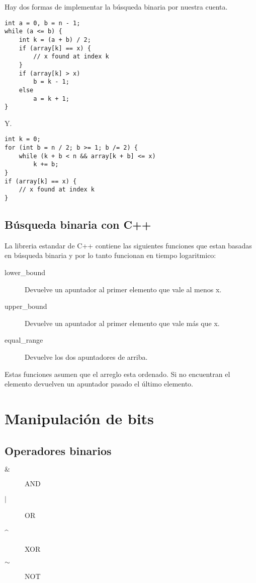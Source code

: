 \documentclass[10pt]{article}
\begin{document}
Hay dos formas de implementar la búsqueda binaria por nuestra cuenta.

\begin{lstlisting}
int a = 0, b = n - 1;
while (a <= b) {
    int k = (a + b) / 2;
    if (array[k] == x) {
        // x found at index k
    }
    if (array[k] > x)
        b = k - 1;
    else
        a = k + 1;
}
\end{lstlisting}

Y.

\begin{lstlisting}
int k = 0;
for (int b = n / 2; b >= 1; b /= 2) {
    while (k + b < n && array[k + b] <= x)
        k += b;
}
if (array[k] == x) {
    // x found at index k
}
\end{lstlisting}

\subsection{Búsqueda binaria con C++}

La libreria estandar de C++ contiene las siguientes funciones que estan basadas en búsqueda binaria y por lo tanto funcionan en tiempo logaritmico:

\begin{description}
    \item[lower\_bound] Devuelve un apuntador al primer elemento que vale al menos x.
    \item[upper\_bound] Devuelve un apuntador al primer elemento que vale más que x.
    \item[equal\_range] Devuelve los dos apuntadores de arriba.
\end{description}

Estas funciones asumen que el arreglo esta ordenado. Si no encuentran el
elemento devuelven un apuntador pasado el último elemento.

\section{Manipulación de bits}

\subsection{Operadores binarios}

\begin{description}
    \item[$ \& $] AND
    \item[$ | $] OR
    \item[\^{}] XOR
    \item[$ \sim $] NOT
\end{description}
\end{document}
